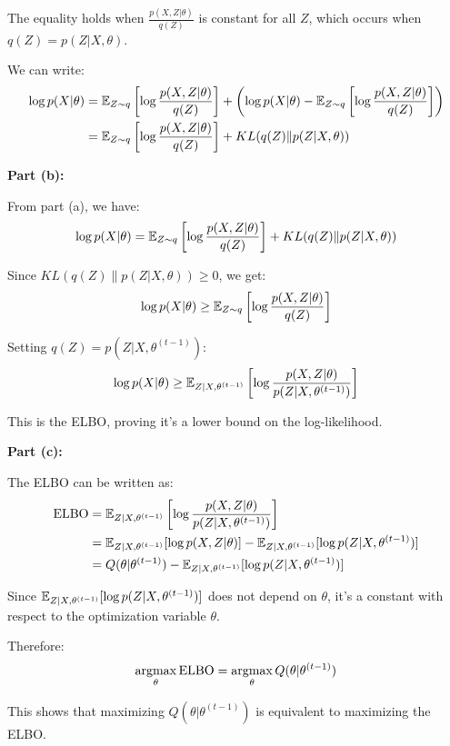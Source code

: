 The equality holds when $\frac{p(X,Z|\theta)}{q(Z)}$ is constant for all $Z$, which occurs when $q(Z) = p(Z|X,\theta)$.

We can write:
\begin{align}
\log p(X|\theta) &= \mathbb{E}_{Z \sim q}\left[\log \frac{p(X,Z|\theta)}{q(Z)}\right] + \left(\log p(X|\theta) - \mathbb{E}_{Z \sim q}\left[\log \frac{p(X,Z|\theta)}{q(Z)}\right]\right)\\
&= \mathbb{E}_{Z \sim q}\left[\log \frac{p(X,Z|\theta)}{q(Z)}\right] + KL(q(Z) \| p(Z|X,\theta))
\end{align}

\textbf{Part (b):} 

From part (a), we have:
$$\log p(X|\theta) = \mathbb{E}_{Z \sim q}\left[\log \frac{p(X,Z|\theta)}{q(Z)}\right] + KL(q(Z) \| p(Z|X,\theta))$$

Since $KL(q(Z) \| p(Z|X,\theta)) \geq 0$, we get:
$$\log p(X|\theta) \geq \mathbb{E}_{Z \sim q}\left[\log \frac{p(X,Z|\theta)}{q(Z)}\right]$$

Setting $q(Z) = p(Z|X,\theta^{(t-1)})$:
$$\log p(X|\theta) \geq \mathbb{E}_{Z|X,\theta^{(t-1)}}\left[\log \frac{p(X,Z|\theta)}{p(Z|X,\theta^{(t-1)})}\right]$$

This is the ELBO, proving it's a lower bound on the log-likelihood.

\textbf{Part (c):} 

The ELBO can be written as:
\begin{align}
\text{ELBO} &= \mathbb{E}_{Z|X,\theta^{(t-1)}}\left[\log \frac{p(X,Z|\theta)}{p(Z|X,\theta^{(t-1)})}\right]\\
&= \mathbb{E}_{Z|X,\theta^{(t-1)}}[\log p(X,Z|\theta)] - \mathbb{E}_{Z|X,\theta^{(t-1)}}[\log p(Z|X,\theta^{(t-1)})]\\
&= Q(\theta|\theta^{(t-1)}) - \mathbb{E}_{Z|X,\theta^{(t-1)}}[\log p(Z|X,\theta^{(t-1)})]
\end{align}

Since $\mathbb{E}_{Z|X,\theta^{(t-1)}}[\log p(Z|X,\theta^{(t-1)})]$ does not depend on $\theta$, it's a constant with respect to the optimization variable $\theta$.

Therefore:
$$\mathop{\rm argmax}_{\theta} \text{ELBO} = \mathop{\rm argmax}_{\theta} Q(\theta|\theta^{(t-1)})$$

This shows that maximizing $Q(\theta|\theta^{(t-1)})$ is equivalent to maximizing the ELBO.











\newpage